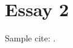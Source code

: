 \documentclass[11pt]{article}
\begin{document}
\section{Essay 2}
Sample cite: \citet{Nobody07}.

\newpage

\end{document}
